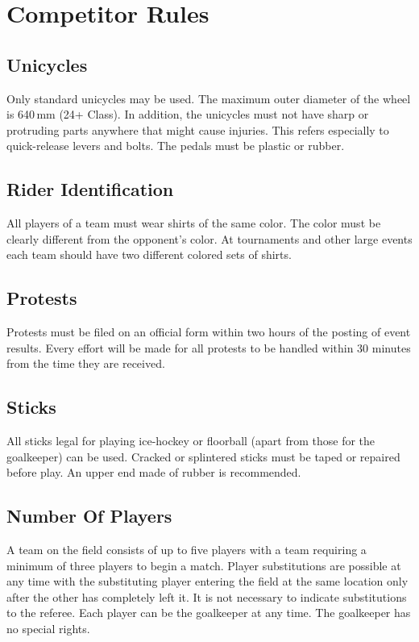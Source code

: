 \chapter{Competitor Rules}

\section{Unicycles}

Only standard unicycles may be used.
The maximum outer diameter of the wheel is 640\,mm (24+ Class).
In addition, the unicycles must not have sharp or protruding parts anywhere that might cause injuries.
This refers especially to quick-release levers and bolts.
The pedals must be plastic or rubber.

\section{Rider Identification}

All players of a team must wear shirts of the same color.
The color must be clearly different from the opponent's color.
At tournaments and other large events each team should have two different colored sets of shirts.

\section{Protests}

Protests must be filed on an official form within two hours of the posting of event results.
Every effort will be made for all protests to be handled within 30 minutes from the time they are received.

\section{Sticks}

All sticks legal for playing ice-hockey or floorball (apart from those for the goalkeeper) can be used.
Cracked or splintered sticks must be taped or repaired before play.
An upper end made of rubber is recommended.

\section{Number Of Players}

A team on the field consists of up to five players with a team requiring a minimum of three players to begin a match.
Player substitutions are possible at any time with the substituting player entering the field at the same location only after the other has completely left it.
It is not necessary to indicate substitutions to the referee.
Each player can be the goalkeeper at any time.
The goalkeeper has no special rights.

